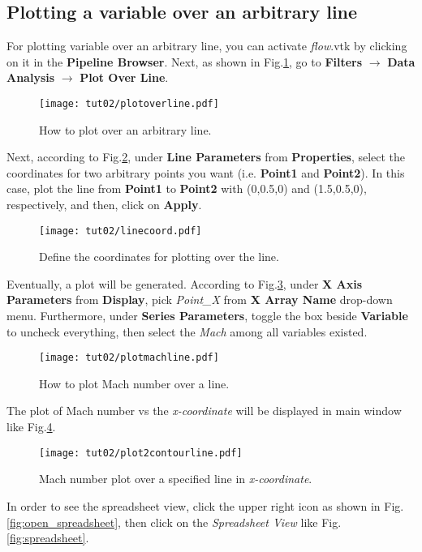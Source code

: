 \subsection{Plotting a variable over an arbitrary line}
For plotting variable over an arbitrary line, you can activate \textit{flow}.vtk by clicking on it in the \textbf{Pipeline Browser}. Next, as shown in Fig.\ref{fig:plot_over_line}, go to \textbf{Filters} $\rightarrow$  \textbf{Data Analysis} $\rightarrow$  \textbf{Plot Over Line}.
\begin{figure}[htbp]
    \centering
    \texttt{[image: tut02/plotoverline.pdf]}
    \caption{How to plot over an arbitrary line.}
    \label{fig:plot_over_line}
\end{figure}
Next, according to Fig.\ref{fig:line_coordinate}, under \textbf{Line Parameters} from \textbf{Properties}, select the coordinates for two arbitrary points you want (i.e. \textbf{Point1} and \textbf{Point2}). In this case, plot the line from \textbf{Point1} to \textbf{Point2} with (0,0.5,0) and (1.5,0.5,0), respectively, and then, click on \textbf{Apply}.
\begin{figure}[htbp]
    \centering
    \texttt{[image: tut02/linecoord.pdf]}
    \caption{Define the coordinates for plotting over the line.}
    \label{fig:line_coordinate}
\end{figure}
Eventually, a plot will be generated. According to Fig.\ref{fig:plot_line_setting}, under \textbf{X Axis Parameters} from \textbf{Display}, pick \textit{Point\_X} from \textbf{X Array Name} drop-down menu. Furthermore, under \textbf{Series Parameters}, toggle the box beside \textbf{Variable} to uncheck everything, then select the \textit{Mach} among all variables existed.
\begin{figure}[htbp]
    \centering
    \texttt{[image: tut02/plotmachline.pdf]}
    \caption{How to plot Mach number over a line.}
    \label{fig:plot_line_setting}
\end{figure}
The plot of Mach number vs the \textit{x-coordinate} will be displayed in main window like Fig.\ref{fig:plot_line}.
\begin{figure}[htbp]
    \centering
    \texttt{[image: tut02/plot2contourline.pdf]}
    \caption{Mach number plot over a specified line in \textit{x-coordinate}.}
    \label{fig:plot_line}
\end{figure}
In order to see the spreadsheet view, click the upper right icon as shown in Fig.\ref{fig:open_spreadsheet}, then click on the \textit{Spreadsheet View} like Fig.\ref{fig:spreadsheet}.

